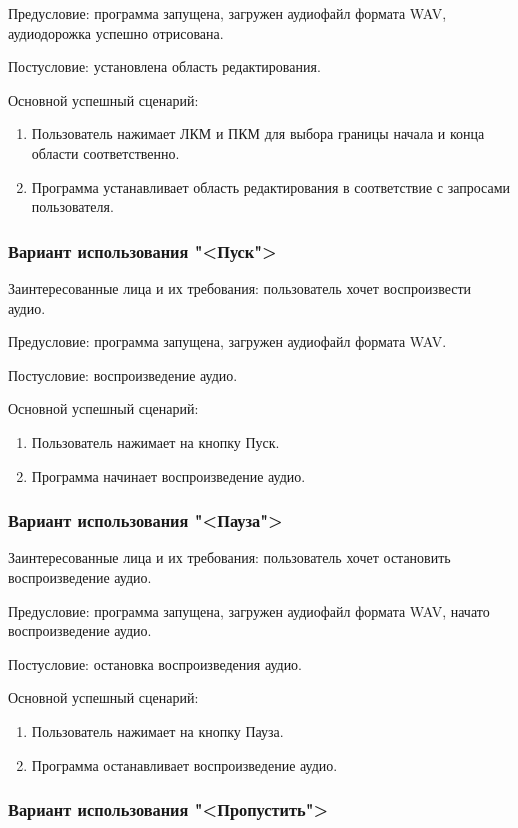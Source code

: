 Предусловие: программа запущена, загружен аудиофайл формата WAV, аудиодорожка успешно отрисована.

Постусловие: установлена область редактирования.

Основной успешный сценарий:
\begin{enumerate}
	\item Пользователь нажимает ЛКМ и ПКМ для выбора границы начала и конца области соответственно.
	\item Программа устанавливает область редактирования в соответствие с запросами пользователя.
\end{enumerate} 

\subsubsection{Вариант использования "<Пуск">}

Заинтересованные лица и их требования: пользователь хочет воспроизвести аудио.

Предусловие: программа запущена, загружен аудиофайл формата WAV.

Постусловие: воспроизведение аудио.

Основной успешный сценарий:
\begin{enumerate}
	\item Пользователь нажимает на кнопку Пуск.
	\item Программа начинает воспроизведение аудио.
\end{enumerate} 

\subsubsection{Вариант использования "<Пауза">}

Заинтересованные лица и их требования: пользователь хочет остановить воспроизведение аудио.

Предусловие: программа запущена, загружен аудиофайл формата WAV, начато воспроизведение аудио.

Постусловие: остановка воспроизведения аудио.

Основной успешный сценарий:
\begin{enumerate}
	\item Пользователь нажимает на кнопку Пауза.
	\item Программа останавливает воспроизведение аудио.
\end{enumerate} 

\subsubsection{Вариант использования "<Пропустить">}

